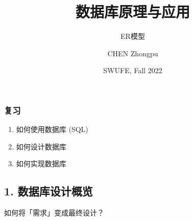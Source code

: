 \documentclass[aspectratio=169, 14pt]{beamer}
\title[Database Principles and Applications] %
{数据库原理与应用}
\subtitle{ER模型}
\author[CHEN Zhongpu] %
{CHEN Zhongpu}
\institute[] %
{
  School of Computing and Artificial Intelligence \\
  \href{mailto:zpchen@swufe.edu.cn}{zpchen@swufe.edu.cn}
}
\date[] %
{SWUFE, Fall 2022}
\begin{document}
\frame{\titlepage}

\begin{frame}
    \frametitle{复习}
    \begin{center}
        \LARGE {}
    \end{center}
    \begin{enumerate}
        \item 如何使用数据库 (SQL)
        \item 如何设计数据库
        \item 如何实现数据库
    \end{enumerate}

\end{frame}

{
    \begin{frame}
        \section{\textcolor{darkmidnightblue}{1. 数据库设计概览}}
        如何将「需求」变成最终设计？
    \end{frame}
}
\end{document}
